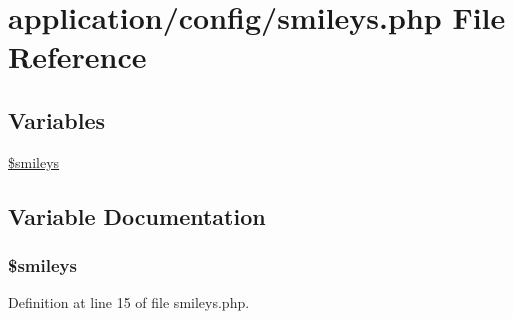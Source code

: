 \hypertarget{smileys_8php}{\section{application/config/smileys.php File Reference}
\label{smileys_8php}
}
\subsection*{Variables}
\begin{DoxyCompactItemize}
\item 
\hyperlink{smileys_8php_a3f21d1c0fb54cb2010e7c7004f29f74c}{\$smileys}
\end{DoxyCompactItemize}


\subsection{Variable Documentation}
\hypertarget{smileys_8php_a3f21d1c0fb54cb2010e7c7004f29f74c}{
\subsubsection[{\$smileys}]{\setlength{\rightskip}{0pt plus 5cm}\$smileys}}\label{smileys_8php_a3f21d1c0fb54cb2010e7c7004f29f74c}


Definition at line 15 of file smileys.\-php.

